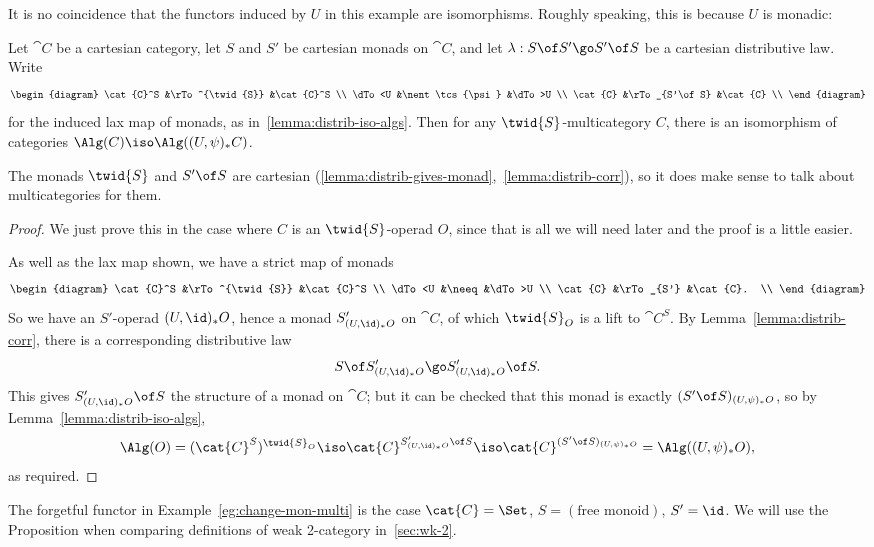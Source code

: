 It is no coincidence that the functors induced by $U$ in this example are
isomorphisms.  Roughly speaking, this is because $U$ is monadic:
%
\begin{propn}	
Let $\cat{C}$ be a cartesian category, let $S$ and $S'$ be cartesian monads
on $\cat{C}$, and let $\lambda: S\of S' \go S'\of S$ be a cartesian
distributive law.  Write
\[
\begin{diagram}
\cat{C}^S	&\rTo^{\twid{S}}	&\cat{C}^S	\\
\dTo<U		&\nent\tcs{\psi}		&\dTo>U		\\
\cat{C}		&\rTo_{S'\of S}		&\cat{C}	\\
\end{diagram}
\]
for the induced lax map of monads, as in~\ref{lemma:distrib-iso-algs}.
Then for any $\twid{S}$-multicategory $C$, there is an isomorphism of
categories $\Alg(C) \iso \Alg((U, \psi)_* C)$.
\end{propn}
% 
The monads $\twid{S}$ and $S'\of S$ are cartesian
(\ref{lemma:distrib-gives-monad},~\ref{lemma:distrib-corr}), so it does
make sense to talk about multicategories for them.  
% 
\begin{proof}
We just prove this in the case where $C$ is an $\twid{S}$-operad $O$, since
that is all we will need later and the proof is a little easier.

As well as the lax map shown, we have a strict map of monads
\[
\begin{diagram}
\cat{C}^S	&\rTo^{\twid{S}}	&\cat{C}^S	\\
\dTo<U		&\neeq			&\dTo>U		\\
\cat{C}		&\rTo_{S'}		&\cat{C}.	\\
\end{diagram}
\]
So we have an $S'$-operad $(U, \id)_* O$, hence a monad $S'_{(U, \id)_*
O}$ on $\cat{C}$, of which $\twid{S}_O$ is a lift to $\cat{C}^S$.  By
Lemma~\ref{lemma:distrib-corr}, there is a corresponding distributive law
\[
S \of S'_{(U, \id)_* O} 
\go 
S'_{(U, \id)_* O} \of S. 
\]
This gives $S'_{(U, \id)_* O} \of S$ the structure of a monad on $\cat{C}$;
but it can be checked that this monad is exactly $(S' \of S)_{(U, \psi)_*
O}$, so by Lemma~\ref{lemma:distrib-iso-algs},
\[
\Alg(O)
=
(\cat{C}^S)^{\twid{S}_O}
\iso
\cat{C}^{S'_{(U, \id)_* O} \of S}
\iso
\cat{C}^{(S' \of S)_{(U, \psi)_* O}}
=
\Alg((U, \psi)_* O),
\]
as required.
\done
\end{proof}
% 
The forgetful functor in Example~\ref{eg:change-mon-multi} is the case
$\cat{C} = \Set$, $S = (\textrm{free monoid})$, $S' = \id$.  We will use
the Proposition when comparing definitions of weak 2-category
in~\ref{sec:wk-2}.%
%
%
%
%




